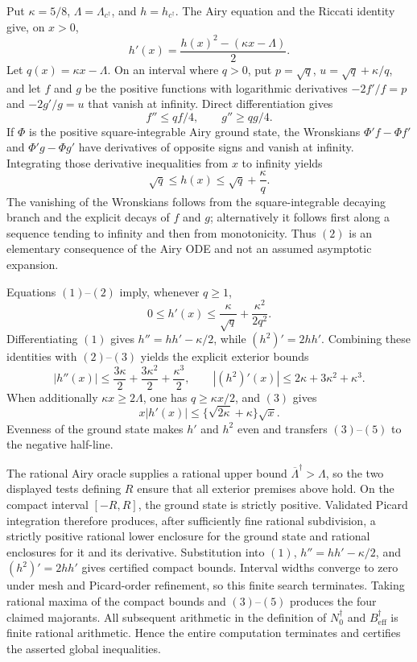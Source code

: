 Put \(\kappa=5/8\), \(\Lambda=\Lambda_{c^\dagger}\), and
\(h=h_{c^\dagger}\).  The Airy equation and the Riccati identity give, on \(x>0\),
\[
h'(x)=\frac{h(x)^2-(\kappa x-\Lambda)}2.
\tag{1}
\]
Let \(q(x)=\kappa x-\Lambda\).  On an interval where \(q>0\), put
\(p=\sqrt q\), \(u=\sqrt q+\kappa/q\), and let \(f\) and \(g\) be the positive functions with logarithmic derivatives
\(-2f'/f=p\) and \(-2g'/g=u\) that vanish at infinity.  Direct differentiation gives
\[
f''\le qf/4,\qquad g''\ge qg/4.
\]
If \(\Phi\) is the positive square-integrable Airy ground state, the Wronskians
\(\Phi'f-\Phi f'\) and \(\Phi'g-\Phi g'\) have derivatives of opposite signs and vanish at infinity.  Integrating those derivative inequalities from \(x\) to infinity yields
\[
\sqrt q\le h(x)\le\sqrt q+\frac{\kappa}{q}.
\tag{2}
\]
The vanishing of the Wronskians follows from the square-integrable decaying branch and the explicit decays of \(f\) and \(g\); alternatively it follows first along a sequence tending to infinity and then from monotonicity.  Thus \((2)\) is an elementary consequence of the Airy ODE and not an assumed asymptotic expansion.

Equations \((1)\)--\((2)\) imply, whenever \(q\ge1\),
\[
0\le h'(x)\le\frac{\kappa}{\sqrt q}+\frac{\kappa^2}{2q^2}.
\tag{3}
\]
Differentiating \((1)\) gives
\(h''=hh'-\kappa/2\), while
\((h^2)'=2hh'\).  Combining these identities with \((2)\)--\((3)\) yields the explicit exterior bounds
\[
|h''(x)|\le\frac{3\kappa}{2}+\frac{3\kappa^2}{2}+\frac{\kappa^3}{2},
\qquad
|(h^2)'(x)|\le2\kappa+3\kappa^2+\kappa^3.
\tag{4}
\]
When additionally \(\kappa x\ge2\Lambda\), one has \(q\ge\kappa x/2\), and \((3)\) gives
\[
x|h'(x)|\le\{\sqrt{2\kappa}+\kappa\}\sqrt x.
\tag{5}
\]
Evenness of the ground state makes \(h'\) and \(h^2\) even and transfers \((3)\)--\((5)\) to the negative half-line.

The rational Airy oracle supplies a rational upper bound
\(\overline\Lambda^\dagger>\Lambda\), so the two displayed tests defining \(R\) ensure that all exterior premises above hold.  On the compact interval \([-R,R]\), the ground state is strictly positive.  Validated Picard integration therefore produces, after sufficiently fine rational subdivision, a strictly positive rational lower enclosure for the ground state and rational enclosures for it and its derivative.  Substitution into \((1)\),
\(h''=hh'-\kappa/2\), and \((h^2)'=2hh'\) gives certified compact bounds.  Interval widths converge to zero under mesh and Picard-order refinement, so this finite search terminates.  Taking rational maxima of the compact bounds and \((3)\)--\((5)\) produces the four claimed majorants.  All subsequent arithmetic in the definition of \(N_0^\dagger\) and \(B_{\mathrm{eff}}^\dagger\) is finite rational arithmetic.  Hence the entire computation terminates and certifies the asserted global inequalities.

